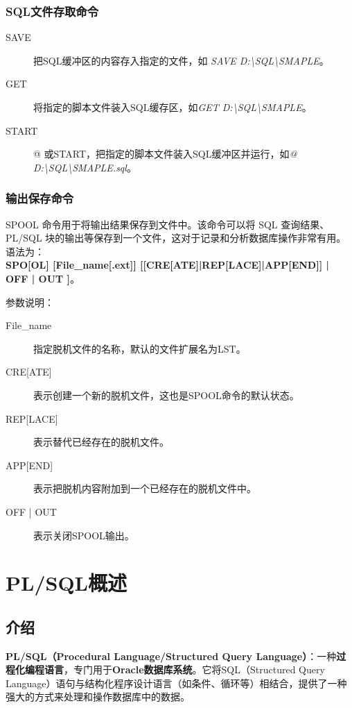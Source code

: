 \documentclass[11pt, a4paper, oneside, UTF8]{ctexbook}
\let\kaishu\relax %
\begin{document}
\subsection{SQL文件存取命令}

\begin{description}
  \item[SAVE] 把SQL缓冲区的内容存入指定的文件，如 \textit{SAVE D:\textbackslash SQL\textbackslash SMAPLE}。
  \item[GET] 将指定的脚本文件装入SQL缓存区，如\textit{GET D:\textbackslash SQL\textbackslash SMAPLE}。
  \item[START] @ 或START，把指定的脚本文件装入SQL缓冲区并运行，如\textit{@ D:\textbackslash SQL\textbackslash SMAPLE.sql}。
\end{description}

\subsection{输出保存命令}
SPOOL 命令用于将输出结果保存到文件中。该命令可以将 SQL 查询结果、PL/SQL 块的输出等保存到一个文件，这对于记录和分析数据库操作非常有用。
语法为：\\
{\bfseries\kaishu SPO[OL] [File\_name[.ext]] [[CRE[ATE]|REP[LACE]|APP[END]] | OFF | OUT ]}。

参数说明：
\begin{description}
  \item[File\_name] 指定脱机文件的名称，默认的文件扩展名为LST。
    \item[\textup{CRE[ATE]}] 表示创建一个新的脱机文件，这也是SPOOL命令的默认状态。
    \item[\textup{REP[LACE]}] 表示替代已经存在的脱机文件。
    \item[\textup{APP[END]}] 表示把脱机内容附加到一个已经存在的脱机文件中。
  \item[OFF | OUT] 表示关闭SPOOL输出。
\end{description}

\chapter{PL/SQL概述}
\section{介绍}
\textbf{PL/SQL（Procedural Language/Structured Query Language）}：一种\textbf{过程化编程语言}，专门用于\textbf{Oracle数据库系统}。它将SQL（Structured Query Language）语句与结构化程序设计语言（如条件、循环等）相结合，提供了一种强大的方式来处理和操作数据库中的数据。
\end{document}
